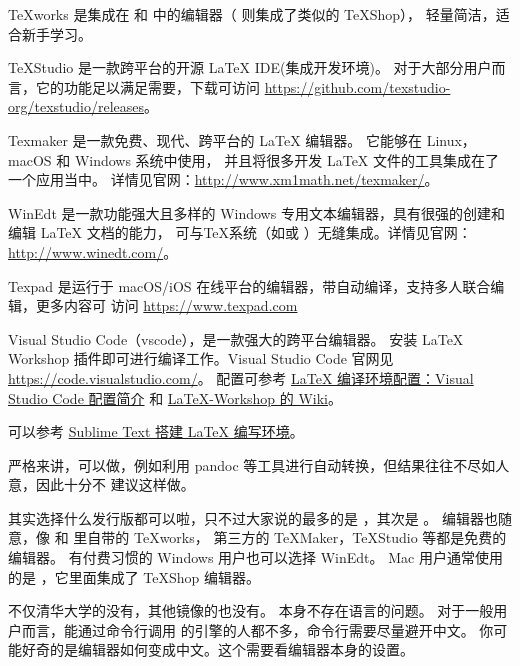 TeXworks 是集成在 \TeXLive{} 和 \MiKTeX{} 中的编辑器（\MacTeX{} 则集成了类似的 
TeXShop），
轻量简洁，适合新手学习。

TeXStudio 是一款跨平台的开源 \LaTeX{} IDE(集成开发环境)。
对于大部分用户而言，它的功能足以满足需要，下载可访问 
\url{https://github.com/texstudio-org/texstudio/releases}。

Texmaker 是一款免费、现代、跨平台的 \LaTeX{} 编辑器。 它能够在 Linux，macOS 和 
Windows 系统中使用，
并且将很多开发 \LaTeX{} 文件的工具集成在了一个应用当中。
详情见官网：\url{http://www.xm1math.net/texmaker/}。

WinEdt 是一款功能强大且多样的 Windows 专用文本编辑器，具有很强的创建和编辑 \LaTeX{} 
文档的能力，
可与TeX系统（如\MiKTeX{}或 
\TeXLive{}）无缝集成。详情见官网：\url{http://www.winedt.com/}。

Texpad 是运行于 macOS/iOS 在线平台的编辑器，带自动编译，支持多人联合编辑，更多内容可
访问
\url{https://www.texpad.com}

Visual Studio Code（vscode），是一款强大的跨平台编辑器。
安装 LaTeX Workshop 插件即可进行编译工作。Visual Studio Code 官网见 
\url{https://code.visualstudio.com/}。
配置可参考 \href{https://github.com/EthanDeng/vscode-latex}{LaTeX 编译环境配置：Visual Studio Code 配置简介} 和 \href{https://github.com/James-Yu/LaTeX-Workshop/wiki}{LaTeX-Workshop 的 Wiki}。


可以参考 \href{https://github.com/EthanDeng/sublime-text-latex}{Sublime Text 搭建 LaTeX 编写环境}。



严格来讲，可以做，例如利用 pandoc 等工具进行自动转换，但结果往往不尽如人意，因此十分不
建议这样做。



其实选择什么发行版都可以啦，只不过大家说的最多的是 \TeXLive{}，其次是 \MiKTeX{}。
编辑器也随意，像 \TeXLive{} 和 \MiKTeX{} 里自带的 TeXworks，
第三方的 TeXMaker，TeXStudio 等都是免费的编辑器。
有付费习惯的 Windows 用户也可以选择 WinEdt。
Mac 用户通常使用的是 \MacTeX{}，它里面集成了 TeXShop 编辑器。



不仅清华大学的没有，其他镜像的也没有。\TeXLive{} 本身不存在语言的问题。
对于一般用户而言，能通过命令行调用 \TeXLive{} 的引擎的人都不多，命令行需要尽量避开中文。
你可能好奇的是编辑器如何变成中文。这个需要看编辑器本身的设置。


